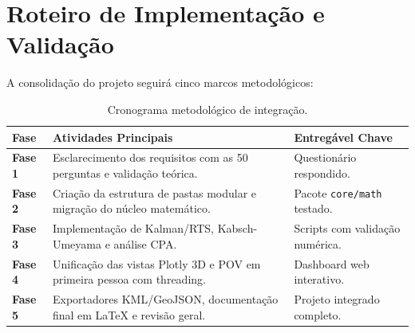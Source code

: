 \documentclass[11pt,a4paper]{article}
\begin{document}
\section{Roteiro de Implementação e Validação}

A consolidação do projeto seguirá cinco marcos metodológicos:

\begin{table}[H]
\centering
\begin{tabular}{lll}
\toprule
\textbf{Fase} & \textbf{Atividades Principais} & \textbf{Entregável Chave} \\
\midrule
\textbf{Fase 1} & Esclarecimento dos requisitos com as 50 perguntas e validação teórica. & Questionário respondido. \\
\textbf{Fase 2} & Criação da estrutura de pastas modular e migração do núcleo matemático. & Pacote \texttt{core/math} testado. \\
\textbf{Fase 3} & Implementação de Kalman/RTS, Kabsch-Umeyama e análise CPA. & Scripts com validação numérica. \\
\textbf{Fase 4} & Unificação das vistas Plotly 3D e POV em primeira pessoa com threading. & Dashboard web interativo. \\
\textbf{Fase 5} & Exportadores KML/GeoJSON, documentação final em LaTeX e revisão geral. & Projeto integrado completo. \\
\bottomrule
\end{tabular}
\caption{Cronograma metodológico de integração.}
\end{table}
\end{document}
